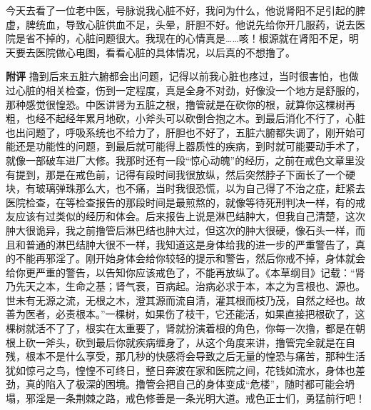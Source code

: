 \begin{case}
    今天去看了一位老中医，号脉说我心脏不好，我问为什么，他说肾阳不足引起的脾虚，脾统血，导致心脏供血不足，头晕，肝胆不好。他说先给你开几服药，说去医院是省不掉的，心脏问题很大。我现在的心情真是……咳！根源就在肾阳不足，明天要去医院做心电图，看看心脏的具体情况，以后真的不想撸了。

    \textbf{附评} 撸到后来五脏六腑都会出问题，记得以前我心脏也疼过，当时很害怕，也做过心脏的相关检查，伤到一定程度，真是全身不对劲，好像没一个地方是舒服的，那种感觉很惶恐。中医讲肾为五脏之根，撸管就是在砍你的根，就算你这棵树再粗，也经不起经年累月地砍，小斧头可以砍倒合抱之木。到最后消化不行了，心脏也出问题了，呼吸系统也不给力了，肝胆也不好了，五脏六腑都失调了，刚开始可能还是功能性的问题，到最后就可能得上器质性的疾病，到时就可能要动手术了，就像一部破车进厂大修。我那时还有一段“惊心动魄”的经历，之前在戒色文章里没有提到，那是在戒色前，记得有段时间我很放纵，然后突然脖子下面长了一个硬块，有玻璃弹珠那么大，也不痛，当时我很恐慌，以为自己得了不治之症，赶紧去医院检查，在等检查报告的那段时间是最煎熬的，就像等待死刑判决一样，有的戒友应该有过类似的经历和体会。后来报告上说是淋巴结肿大，但我自己清楚，这次肿大很诡异，我之前撸管后淋巴结也肿大过，但这次的肿大很硬，像石头一样，而且和普通的淋巴结肿大很不一样，我知道这是身体给我的进一步的严重警告了，真的不能再邪淫了。刚开始身体会给你较轻的提示和警告，然后你戒不掉，身体就会给你更严重的警告，以告知你应该戒色了，不能再放纵了。《本草纲目》记载：“肾乃先天之本，生命之基；肾气衰，百病起。治病必求于本，本之为言根也、源也。世未有无源之流，无根之木，澄其源而流自清，灌其根而枝乃茂，自然之经也。故善为医者，必责根本。”一棵树，如果伤了枝干，它还能活，如果直接把根砍了，这棵树就活不了了，根实在太重要了，肾就扮演着根的角色，你每一次撸，都是在朝根上砍一斧头，砍到最后你就疾病缠身了，从这个角度来讲，撸管完全就是在自残，根本不是什么享受，那几秒的快感将会导致之后无量的惶恐与痛苦，那种生活犹如惊弓之鸟，惶惶不可终日，整日奔波在家和医院之间，花钱如流水，身体也差劲，真的陷入了极深的困境。撸管会把自己的身体变成“危楼”，随时都可能会坍塌，邪淫是一条荆棘之路，戒色修善是一条光明大道。戒色正士们，勇猛前行吧！
\end{case}


